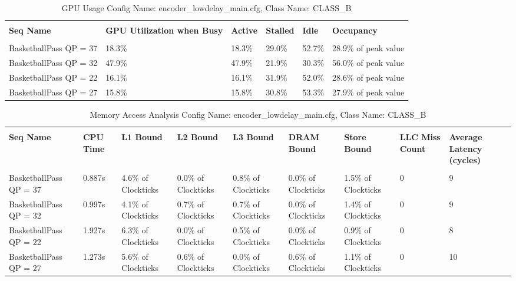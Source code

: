 \documentclass{article}%
\begin{document}
\newpage%
\begin{longtabu}{| X[l] | X[l] | X[l] | X[l] | X[l] | X[l] |}%
\caption{%
GPU Usage\newline%
 Config Name: encoder\_lowdelay\_main.cfg,\newline%
 Class Name: CLASS\_B\newline%
%
}%
\hline%
&&&&&\\%
\textbf{Seq Name}&\textbf{GPU Utilization when Busy}&\textbf{Active}&\textbf{Stalled}&\textbf{Idle}&\textbf{Occupancy}\\%
&&&&&\\%
\hline%
\endhead%
BasketballPass\newline%
 QP = 37&18.3\%&18.3\%&29.0\%&52.7\%&28.9\% of peak value\\%
\hline%
BasketballPass\newline%
 QP = 32&47.9\%&47.9\%&21.9\%&30.3\%&56.0\% of peak value\\%
\hline%
BasketballPass\newline%
 QP = 22&16.1\%&16.1\%&31.9\%&52.0\%&28.6\% of peak value\\%
\hline%
BasketballPass\newline%
 QP = 27&15.8\%&15.8\%&30.8\%&53.3\%&27.9\% of peak value\\%
\hline%
\end{longtabu}%
\begin{longtabu}{| X[l] | X[l] | X[l] | X[l] | X[l] | X[l] | X[l] | X[l] | X[l] |}%
\caption{%
Memory Access Analysis\newline%
 Config Name: encoder\_lowdelay\_main.cfg,\newline%
 Class Name: CLASS\_B\newline%
%
}%
\hline%
&&&&&&&&\\%
\textbf{Seq Name}&\textbf{CPU Time}&\textbf{L1 Bound}&\textbf{L2 Bound}&\textbf{L3 Bound}&\textbf{DRAM Bound}&\textbf{Store Bound}&\textbf{LLC Miss Count}&\textbf{Average Latency (cycles)}\\%
&&&&&&&&\\%
\hline%
\endhead%
BasketballPass\newline%
 QP = 37&0.887s&4.6\% of Clockticks&0.0\% of Clockticks&0.8\% of Clockticks&0.0\% of Clockticks&1.5\% of Clockticks&0&9\\%
\hline%
BasketballPass\newline%
 QP = 32&0.997s&4.1\% of Clockticks&0.7\% of Clockticks&0.7\% of Clockticks&0.0\% of Clockticks&1.4\% of Clockticks&0&9\\%
\hline%
BasketballPass\newline%
 QP = 22&1.927s&6.3\% of Clockticks&0.0\% of Clockticks&0.5\% of Clockticks&0.0\% of Clockticks&0.9\% of Clockticks&0&8\\%
\hline%
BasketballPass\newline%
 QP = 27&1.273s&5.6\% of Clockticks&0.6\% of Clockticks&0.0\% of Clockticks&0.6\% of Clockticks&1.1\% of Clockticks&0&10\\%
\hline%
\end{longtabu}%
\end{document}
